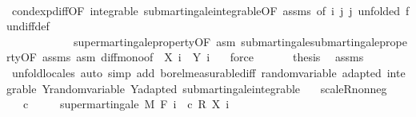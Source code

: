 \begin{isabellebody}
\ \ \ \ \ \ \isamarkupfalse%
\ cond{\isacharunderscore}{\kern0pt}exp{\isacharunderscore}{\kern0pt}diff{\isacharbrackleft}{\kern0pt}OF\ integrable\ submartingale{\isachardot}{\kern0pt}integrable{\isacharbrackleft}{\kern0pt}OF\ assms{\isacharbrackright}{\kern0pt}{\isacharcomma}{\kern0pt}\ of\ i\ j\ j{\isacharcomma}{\kern0pt}\ unfolded\ fun{\isacharunderscore}{\kern0pt}diff{\isacharunderscore}{\kern0pt}def{\isacharbrackright}{\kern0pt}\ \isanewline
\ \ \ \ \ \ \ \ \ \ \ \ supermartingale{\isacharunderscore}{\kern0pt}property{\isacharbrackleft}{\kern0pt}OF\ asm{\isacharbrackright}{\kern0pt}\ submartingale{\isachardot}{\kern0pt}submartingale{\isacharunderscore}{\kern0pt}property{\isacharbrackleft}{\kern0pt}OF\ assms\ asm{\isacharbrackright}{\kern0pt}\ diff{\isacharunderscore}{\kern0pt}mono{\isacharbrackleft}{\kern0pt}of\ {\isacharunderscore}{\kern0pt}\ {\isachardoublequoteopen}X\ i\ {\isacharunderscore}{\kern0pt}{\isachardoublequoteclose}\ {\isachardoublequoteopen}Y\ i\ {\isacharunderscore}{\kern0pt}{\isachardoublequoteclose}{\isacharbrackright}{\kern0pt}\ \isamarkupfalse%
\ force\isanewline
\ \ \isacommand{{\isacharbraceright}{\kern0pt}}\isamarkupfalse%
\isanewline
\ \ \isamarkupfalse%
\ {\isacharquery}{\kern0pt}thesis\ \isamarkupfalse%
\ assms\ \isamarkupfalse%
\ {\isacharparenleft}{\kern0pt}unfold{\isacharunderscore}{\kern0pt}locales{\isacharparenright}{\kern0pt}\ {\isacharparenleft}{\kern0pt}auto\ simp\ add{\isacharcolon}{\kern0pt}\ borel{\isacharunderscore}{\kern0pt}measurable{\isacharunderscore}{\kern0pt}diff\ random{\isacharunderscore}{\kern0pt}variable\ adapted\ integrable\ Y{\isachardot}{\kern0pt}random{\isacharunderscore}{\kern0pt}variable\ Y{\isachardot}{\kern0pt}adapted\ submartingale{\isachardot}{\kern0pt}integrable{\isacharparenright}{\kern0pt}\ \ \isanewline
{}\isamarkupfalse%
%
\endisatagproof
{\isafoldproof}%
%
\isadelimproof
\isanewline
%
\endisadelimproof
\isanewline
{}\isamarkupfalse%
\ scaleR{\isacharunderscore}{\kern0pt}nonneg{\isacharcolon}{\kern0pt}\ \isanewline
\ \ \ {\isachardoublequoteopen}c\ {\isasymge}\ {}{\isachardoublequoteclose}\isanewline
\ \ \ {\isachardoublequoteopen}supermartingale\ M\ F\ {\isacharparenleft}{\kern0pt}{\isasymlambda}i\ {\isasymxi}{\isachardot}{\kern0pt}\ c\ {\isacharasterisk}{\kern0pt}\isactrlsub R\ X\ i\ {\isasymxi}{\isacharparenright}{\kern0pt}{\isachardoublequoteclose}\isanewline
%
\isadelimproof
%
\endisadelimproof
%
\isatagproof
{}\isamarkupfalse%

\end{isabellebody}

